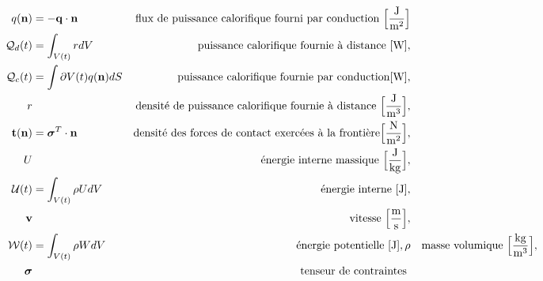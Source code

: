 \begin{align*}
    q(\vb{n}) &= - \vb{q} \cdot \vb{n} & \textrm{flux de puissance calorifique fourni par conduction } \Big[\si{\frac{J}{m^2}}\Big]\\
    \mathcal{Q}_d(t) &= \int_{V(t)} r dV & \textrm{puissance calorifique fournie à distance } [\si{W}], \\
    \mathcal{Q}_c(t) &= \int{\partial V(t)} q(\vb{n}) dS & \textrm{puissance calorifique fournie par conduction} [\si{W}], \\
    r & & \textrm{densité de puissance calorifique fournie à distance } \Big[\si{\frac{J}{m^3}}\Big],\\
    \vb{t}(\vb{n}) &= \boldsymbol{\sigma}^T \cdot \vb{n} & \textrm{densité des forces de contact exercées à la frontière} \Big[\si{\frac{N}{m^2}}\Big],\\
    U & & \textrm{énergie interne massique } \Big[\si{\frac{J}{kg}}\Big],\\
    \mathcal{U}(t) &= \int_{V(t)} \rho U dV & \textrm{énergie interne } [\si{J}],\\
    \vb{v} & & \textrm{vitesse } \Big[\si{\frac{m}{s}}\Big],\\
    \mathcal{W}(t) &= \int_{V(t)} \rho W dV & \textrm{énergie potentielle } [\si{J}],
    \rho & & \textrm{masse volumique } \Big[\si{\frac{kg}{m^3}}\Big],\\
    \boldsymbol{\sigma} & & \textrm{tenseur de contraintes }
  \end{align*}
  \endgroup
